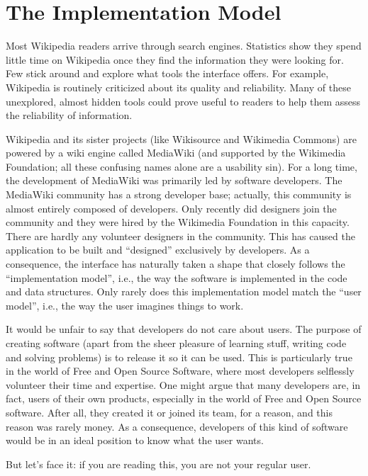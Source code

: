 \section*{The Implementation Model}

Most Wikipedia readers arrive through search engines. Statistics show they spend
little time on Wikipedia once they find the information they were looking for.
Few stick around and explore what tools the interface offers. For example,
Wikipedia is routinely criticized about its quality and reliability. Many of
these unexplored, almost hidden tools could prove useful to readers to help them
assess the reliability of information.

Wikipedia and its sister projects (like Wikisource and Wikimedia Commons)
are powered by a wiki engine called MediaWiki
(and supported by the Wikimedia Foundation; all these confusing names alone are
a usability sin). For a long time, the development of MediaWiki was primarily
led by software developers. The MediaWiki community has a strong developer base;
actually, this community is almost entirely composed of developers. Only
recently did designers join the community and they were hired by the Wikimedia
Foundation in this capacity. There are hardly any volunteer designers in the
community. This has caused the application to be built and ``designed''
exclusively by developers. As a consequence, the interface has naturally taken a
shape that closely follows the ``implementation model'', i.e., the way the
software is implemented in the code and data structures. Only rarely does this
implementation model match the ``user model'', i.e., the way the user imagines
things to work.

It would be unfair to say that developers do not care about users. The purpose
of creating software (apart from the sheer pleasure of learning stuff,
writing code and solving problems) is to release it so it can be used. This is
particularly true in the world of Free and Open Source Software, where most
developers selflessly volunteer their time and expertise. One might argue that
many developers are, in fact, users of their own products, especially in the
world of Free and Open Source software. After all, they created it or joined
its team, for a reason, and this reason was rarely money. As a consequence,
developers of this kind of software would be in an ideal position to know what
the user wants.

But let's face it: if you are reading this, you are not your regular user.

